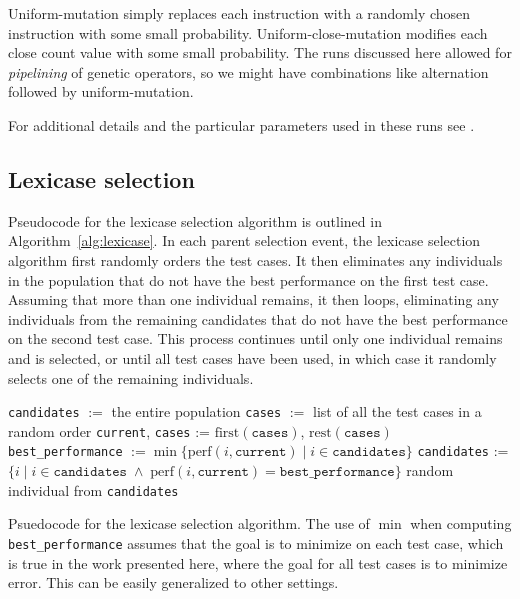 Uniform-mutation simply replaces each instruction with a randomly chosen instruction with some
small probability. Uniform-close-mutation modifies each close count value with some small probability.
The runs discussed here allowed for \emph{pipelining} of genetic operators, so we might have
combinations like alternation followed by uniform-mutation.

For additional details and the particular parameters used in these runs see \citep{Helmuth:2015:GECCO}.

\subsection{Lexicase selection}

Pseudocode for the lexicase selection algorithm is outlined in 
Algorithm~\ref{alg:lexicase}. In each parent selection event, the lexicase selection algorithm 
first randomly orders the test cases. It then eliminates any individuals in the population 
that do not have the best performance on the first test case. 
Assuming that more than one individual remains, it then loops, eliminating any individuals from 
the remaining candidates that do not have the best performance on the second test case. This 
process continues until only one individual remains and is selected, or until all test cases 
have been used, in which case it randomly selects one of the remaining individuals.

\begin{algorithm}[tb]
	\begin{algorithmic}
		\STATE \texttt{candidates} $:=$ the entire population
		\STATE \texttt{cases} $:=$ list of all the test cases in a random order
		\STATE \texttt{current}, \texttt{cases} := $\textrm{first}(\texttt{cases})$, $\textrm{rest}(\texttt{cases})$
		\STATE \texttt{best\_performance} $:= \min \{ \textrm{perf}(i, \texttt{current}) \;|\; i \in \texttt{candidates} \}$
		\STATE \texttt{candidates} := $\{ i \;|\; i \in \texttt{candidates} \;\land\; \textrm{perf}(i, \texttt{current}) = \texttt{best\_performance}\}$
		\ENDWHILE
		\RETURN random individual from \texttt{candidates}
	\end{algorithmic}
	\caption{Psuedocode for the lexicase selection algorithm. The use of $\min$ when computing 
		\texttt{best\_performance} assumes that the goal is to minimize on each test case, which
		is true in the work presented here, where the goal for all test cases is to minimize error.
		This can be easily generalized to other settings.}
	\label{alg:lexicase}
\end{algorithm}

